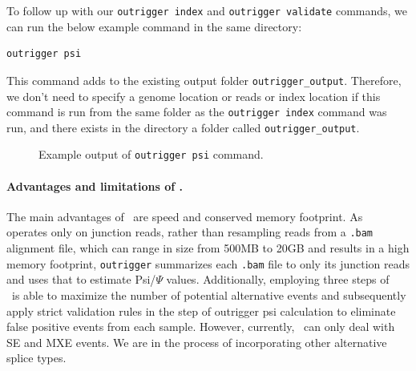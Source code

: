 To follow up with our \texttt{outrigger index} and \texttt{outrigger validate} commands, we can run the below example command in the same directory:

\begin{verbatim}
outrigger psi
\end{verbatim}

This command adds to the existing output folder \texttt{outrigger\_output}. Therefore, we don't need to specify a genome location or reads or index location if this command is run from the same folder as the \texttt{outrigger index} command was run, and there exists in the directory a folder called \texttt{outrigger\_output}. 

\begin{figure}
\caption{Example output of \texttt{outrigger psi} command.}
\end{figure}

\paragraph{Advantages and limitations of \outrigger.}

The main advantages of \outrigger\, are speed and conserved memory footprint. As \outrigger\, operates only on junction reads, rather than resampling reads from a \texttt{.bam} alignment file, which can range in size from 500MB to 20GB and results in a high memory footprint, \texttt{outrigger} summarizes each \texttt{.bam} file to only its junction reads and uses that to estimate Psi/$\Psi$ values. Additionally, employing three steps of \outrigger\, \outrigger\ is able to maximize the number of potential alternative events and subsequently apply strict validation rules in the step of outrigger psi calculation to eliminate false positive events from each sample. 
However, currently, \outrigger\ can only deal with SE and MXE events. We are in the process of incorporating other alternative splice types.

